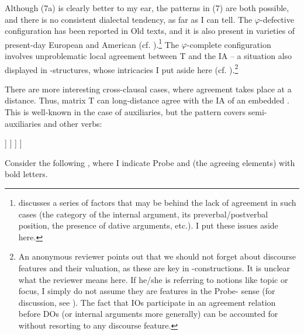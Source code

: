 \documentclass[output=paper]{langsci/langscibook}
\begin{document}
Although (7a) is clearly better to my ear, the patterns in (7) are both possible, and there is no consistent dialectal tendency, as far as I can tell. The $\varphi $-defective configuration has been reported in Old  texts, and it is also present in varieties of present-day European and American  (cf. \citealt{Mendikoetxea1999}).\footnote{\citet{RAE-ASALE2009} discusses a series of factors that may be behind the lack of agreement in such cases (the category of the internal argument, its preverbal\slash postverbal position, the presence of dative arguments, etc.). I put these issues aside here.} The $\varphi $-complete configuration involves unproblematic local agreement between T and the IA – a situation also displayed in \DAT-\NOM structures, whose intricacies I put aside here (cf. \citealt{López2007,Chomsky2008}).\footnote{An anonymous reviewer points out that we should not forget about discourse features and their valuation, as these are key in \DAT-\NOM constructions. It is unclear what the reviewer means here. If he\slash she is referring to notions like topic or focus, I simply do not assume they are features in the Probe- sense (for discussion, see \citealt{Chomsky2001Derivation,Chomsky2008,Chomsky2017,Ott2016}). The fact that IOs participate in an agreement relation before DOs (or internal arguments more generally)  can be accounted for without resorting to any discourse feature.} 

There are more interesting cross-clausal cases, where agreement takes place at a distance. Thus, matrix T can long-distance agree with the IA of an embedded . This is well-known in the case of auxiliaries, but the pattern covers semi-auxiliaries and other verbs: 

\ea%
\settowidth\jamwidth{[\textsc{semiaux} = try, need, etc.]}
    \label{ex:gallego:8}
    \ea\relax [ T [ SE  V\textsubscript{AUX}         [ INF XP ] ] ]      \jambox{[\textsc{aux} = can, should, etc.]}
    \ex\relax [ T [ SE  V\textsubscript{SEMIAUX}  [ INF XP ] ] ]         \jambox{[\textsc{semiaux} = try, need, etc.]}
    \z
\z\largerpage[-2]

Consider the following \citep[Chapter~28]{RAE-ASALE2009}, where I indicate Probe and  (the agreeing elements) with bold letters.
\end{document}

